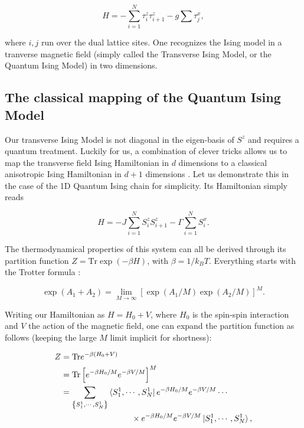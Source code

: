 \documentclass[11pt,openany]{article}
\begin{document}
\begin{equation}
	H = -\sum_{i=1}^N\tau^z_i\tau^z_{i+1} - g\sum\tau^x_j,
\end{equation}

where $i,j$ run over the dual lattice sites. One recognizes the Ising model in a tranverse magnetic field (simply called the Transverse Ising Model, or the Quantum Ising Model) in two dimensions.


\subsection{The classical mapping of the Quantum Ising Model}

Our transverse Ising Model is not diagonal in the eigen-basis of $S^z$ and requires a quantum treatment. Luckily for us, a combination of clever tricks allows us to map the transverse field Ising Hamiltonian in $d$ dimensions to a classical anisotropic Ising Hamiltonian in $d+1$ dimensions \cite{Chakrabarti}. Let us demonstrate this in the case of the 1D Quantum Ising chain  for simplicity. Its Hamiltonian simply reads

\begin{equation}
	H = -J\sum_{i=1}^N S_i^zS_{i+1}^z - \Gamma\sum_{i=1}^N S_i^x.
\end{equation}

The thermodynamical properties of this system can all be derived through its partition function $Z = \mathrm{Tr}\exp(-\beta H)$, with $\beta=1/k_BT$. Everything starts with the Trotter formula \cite{trotter}:

\begin{equation}
	\exp\left(A_1+A_2\right) =  \lim_{M\to\infty}\left[\exp\left(A_1/M\right)\exp\left(A_2/M\right)\right]^M.
\end{equation}

Writing our Hamiltonian as $H = H_0 + V$, where $H_0$ is the spin-spin interaction and $V$ the action of the magnetic field, one can expand the partition function as follows (keeping the large $M$ limit implicit for shortness):

\begin{align*}
	Z &= \mathrm{Tr}e^{-\beta\left(H_0+V\right)}\\
	&= \mathrm{Tr}\left[e^{-\beta H_0/M}e^{-\beta V/M}\right]^M\\
	&= \sum_{\left\{S^1_1,\cdots,S^1_N\right\}}\bra{S^1_1,\cdots,S^1_N}e^{-\beta H_0/M}e^{-\beta V/M}\cdots\\
	&\hspace{3cm}\times e^{-\beta H_0/M}e^{-\beta V/M}\ket{S^1_1,\cdots,S^1_N},
\end{align*}
\end{document}
